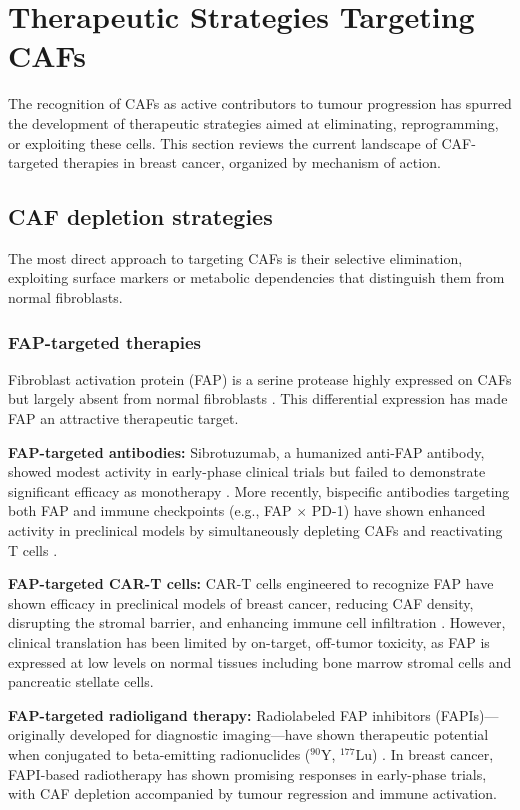 \section{Therapeutic Strategies Targeting CAFs}
\label{sec:therapy}

The recognition of CAFs as active contributors to tumour progression has spurred the development of therapeutic strategies aimed at eliminating, reprogramming, or exploiting these cells. This section reviews the current landscape of CAF-targeted therapies in breast cancer, organized by mechanism of action.

\subsection{CAF depletion strategies}

The most direct approach to targeting CAFs is their selective elimination, exploiting surface markers or metabolic dependencies that distinguish them from normal fibroblasts.

\subsubsection{FAP-targeted therapies}

Fibroblast activation protein (FAP) is a serine protease highly expressed on CAFs but largely absent from normal fibroblasts \citep{garin2010}. This differential expression has made FAP an attractive therapeutic target.

\textbf{FAP-targeted antibodies:} Sibrotuzumab, a humanized anti-FAP antibody, showed modest activity in early-phase clinical trials but failed to demonstrate significant efficacy as monotherapy \citep{scott2003}. More recently, bispecific antibodies targeting both FAP and immune checkpoints (e.g., FAP $\times$ PD-1) have shown enhanced activity in preclinical models by simultaneously depleting CAFs and reactivating T cells \citep{fang2023}.

\textbf{FAP-targeted CAR-T cells:} CAR-T cells engineered to recognize FAP have shown efficacy in preclinical models of breast cancer, reducing CAF density, disrupting the stromal barrier, and enhancing immune cell infiltration \citep{wang2014}. However, clinical translation has been limited by on-target, off-tumor toxicity, as FAP is expressed at low levels on normal tissues including bone marrow stromal cells and pancreatic stellate cells.

\textbf{FAP-targeted radioligand therapy:} Radiolabeled FAP inhibitors (FAPIs)---originally developed for diagnostic imaging---have shown therapeutic potential when conjugated to beta-emitting radionuclides ($^{90}$Y, $^{177}$Lu) \citep{kratochwil2019}. In breast cancer, FAPI-based radiotherapy has shown promising responses in early-phase trials, with CAF depletion accompanied by tumour regression and immune activation.

